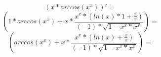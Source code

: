 \documentclass[a4paper,12pt]{article}
\begin{document}
\begin{equation}
\left( {x }* {arccos \left( {{x }^ {x }}\right) }\right)' =
\end{equation}
\begin{equation}
\left( {{1 }* {arccos \left( {{x }^ {x }}\right) }}+ {{x }* {\frac{{{{x }^ {x }}* {\left( {{ln \left( {x }\right) }* {1 }}+ {\frac{{x }}{{x }}}\right) }}}{{{\left( -1 \right) }* {\sqrt {{{1 }- {{{x }^ {x }}* {{x }^ {x }}}}} }}}}}\right) =
\end{equation}
\begin{equation}
\left( {arccos \left( {{x }^ {x }}\right) }+ {{x }* {\frac{{{{x }^ {x }}* {\left( {ln \left( {x }\right) }+ {\frac{{x }}{{x }}}\right) }}}{{{\left( -1 \right) }* {\sqrt {{{1 }- {{{x }^ {x }}* {{x }^ {x }}}}} }}}}}\right) =
\end{equation}
\end{document}
